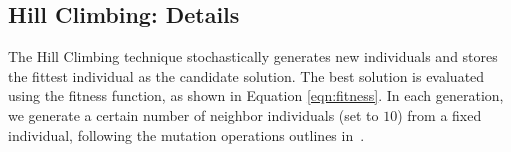


\subsection{Hill Climbing: Details}
\label{subsection:method_hc}
The Hill Climbing technique stochastically generates new individuals and stores the fittest individual as the candidate solution. 
The best solution is evaluated using the fitness function, as shown in Equation \ref{eqn:fitness}. 
In each generation, we generate a certain number of neighbor individuals (set to $10$) from a fixed individual, 
following the mutation operations outlines in~. 


